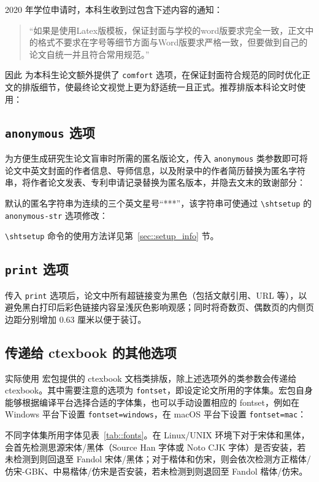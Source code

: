 \documentclass[bachelor, comfort]{shtthesis}
\begin{document}
2020 年学位申请时，本科生收到过包含下述内容的通知：
\begin{quotation}
\fangsong “如果是使用Latex版模板，保证封面与学校的word版要求完全一致，正文中的格式不要求在字号等细节方面与Word版要求严格一致，但要做到自己的论文自统一并且符合常用规范。”
\end{quotation}
因此 \shtthesis{} 为本科生论文额外提供了 \verb|comfort| 选项，在保证封面符合规范的同时优化正文的排版细节，使最终论文视觉上更为舒适统一且正式。推荐排版本科论文时使用：

\subsection{\texttt{anonymous} 选项} \label{sec::option_anonymous}
为方便生成研究生论文盲审时所需的匿名版论文，传入 \verb|anonymous| 类参数即可将论文中英文封面的作者信息、导师信息，以及附录中的作者简历替换为匿名字符串，将作者论文发表、专利申请记录替换为匿名版本，并隐去文末的致谢部分：
\shtthesis{} 默认的匿名字符串为连续的三个英文星号“***”，该字符串可使通过 \verb|\shtsetup| 的 \verb|anonymous-str| 选项修改：
\begin{latex}
\end{latex}
\verb|\shtsetup| 命令的使用方法详见第~\ref{sec::setup_info} 节。

\subsection{\texttt{print} 选项}
传入 \verb|print| 选项后，论文中所有超链接变为黑色（包括文献引用、URL 等），以避免黑白打印后彩色链接内容呈浅灰色影响观感；同时将奇数页、偶数页的内侧页边距分别增加 0.63 厘米以便于装订。

\subsection{传递给 \textsf{ctexbook} 的其他选项}
\shtthesis{} 实际使用 \CTeX 宏包提供的 \textsf{ctexbook} 文档类排版，除上述选项外的类参数会传递给 \textsf{ctexbook}。其中需要注意的选项为 \verb|fontset|，即设定论文所用的字体集。\CTeX 宏包自身能够根据编译平台选择合适的字体集，也可以手动设置相应的 fontset，例如在 Windows 平台下设置 \verb|fontset=windows|，在 macOS 平台下设置 \verb|fontset=mac|：
不同字体集所用字体见表~\ref{tab::fonts}。在 Linux/UNIX 环境下对于宋体和黑体，会首先检测思源宋体/黑体（Source Han 字体或 Noto CJK 字体）是否安装，若未检测到则回退至 Fandol 宋体/黑体；对于楷体和仿宋，则会依次检测方正楷体/仿宋-GBK、中易楷体/仿宋是否安装，若未检测到则退回至 Fandol 楷体/仿宋。
\end{document}
